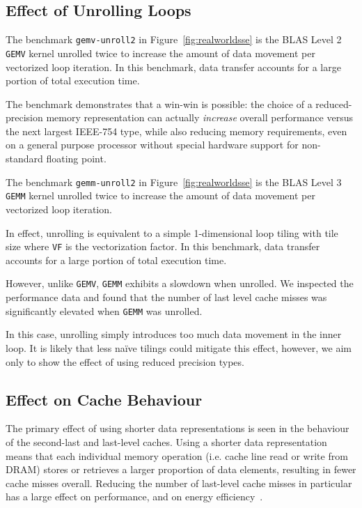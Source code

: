 \documentclass{sig-alternate-05-2015}
\newcommand{\mt}[1]{\texttt{#1}}
\begin{document}
\subsection{Effect of Unrolling Loops}

The benchmark \texttt{gemv-unroll2} in Figure~\ref{fig:realworldsse} is the
BLAS Level 2 \texttt{GEMV} kernel unrolled twice to increase the amount of data
movement per vectorized loop iteration. In this benchmark, data transfer
accounts for a large portion of total execution time.

The benchmark demonstrates that a win-win is possible: the choice of a
reduced-precision memory representation can actually \emph{increase} overall
performance versus the next largest IEEE-754 type, while also reducing memory
requirements, even on a general purpose processor without special hardware
support for non-standard floating point.

The benchmark \texttt{gemm-unroll2} in Figure~\ref{fig:realworldsse} is the
BLAS Level 3 \texttt{GEMM} kernel unrolled twice to increase the amount of data
movement per vectorized loop iteration.

In effect, unrolling is equivalent to a simple 1-dimensional loop tiling with
tile size  where \mt{VF} is the vectorization factor. In
this benchmark, data transfer accounts for a large portion of total execution
time.

However, unlike \texttt{GEMV}, \texttt{GEMM} exhibits a slowdown when unrolled.
We inspected the performance data and found that the number of last level cache
misses was significantly elevated when \texttt{GEMM} was unrolled.

In this case, unrolling simply introduces too much data movement in the inner
loop. It is likely that less na\"ive tilings could mitigate this effect,
however, we aim only to show the effect of using reduced precision types.

\eject
\subsection{Effect on Cache Behaviour}

The primary effect of using shorter data representations is seen in the
behaviour of the second-last and last-level caches. Using a shorter data
representation means that each individual memory operation (i.e. cache line
read or write from DRAM) stores or retrieves a larger proportion of data
elements, resulting in fewer cache misses overall. Reducing the number of
last-level cache misses in particular has a large effect on performance, and on
energy efficiency~\cite{gustafson}.
\end{document}
